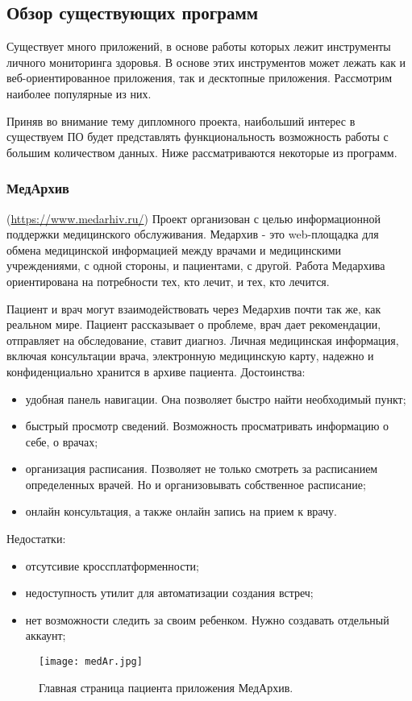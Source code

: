 \subsection{Обзор существующих программ} %
\label{sub:domain:existing_programs}
Существует много приложений, в основе работы которых лежит инструменты личного мониторинга здоровья. В основе этих инструментов может лежать как и веб-ориентированное приложения, так и десктопные приложения. Рассмотрим наиболее популярные из них.

Приняв во внимание тему дипломного проекта, наибольший интерес в существуем ПО будет представлять функциональность возможность работы с большим количеством данных.
Ниже рассматриваются некоторые из программ.

\subsubsection{МедАрхив }(\url{https://www.medarhiv.ru/}) 
Проект организован с целью информационной поддержки медицинского обслуживания. Медархив - это web-площадка для обмена медицинской информацией между врачами и медицинскими учреждениями, с одной стороны, и пациентами, с другой. Работа Медархива ориентирована на потребности тех, кто лечит, и тех, кто лечится.

Пациент и врач могут взаимодействовать через Медархив почти так же, как реальном мире. Пациент рассказывает о проблеме, врач дает рекомендации, отправляет на обследование, ставит диагноз. Личная медицинская информация, включая консультации врача, электронную медицинскую карту, надежно и конфиденциально хранится в архиве пациента.
Достоинства:
\begin{itemize}
  \item удобная панель навигации. Она позволяет быстро найти необходимый пункт;
  \item быстрый просмотр сведений. Возможность просматривать информацию о себе, о врачах;
  \item организация расписания. Позволяет не только смотреть за расписанием определенных врачей. Но и организовывать собственное расписание;
  \item онлайн консультация, а также онлайн запись на прием к врачу.
\end{itemize}
Недостатки:
\begin{itemize}
  \item отсутсивие кроссплатформенности;
  \item недоступность утилит для автоматизации создания встреч;
  \item нет возможности следить за своим ребенком. Нужно создавать отдельный аккаунт;
\end{itemize}
\begin{figure}[ht]
\centering
  \texttt{[image: medAr.jpg]}  
  \caption{ Главная страница пациента приложения МедАрхив. }
  \label{fig:domain:manual_structure:credit_med}
\end{figure}


